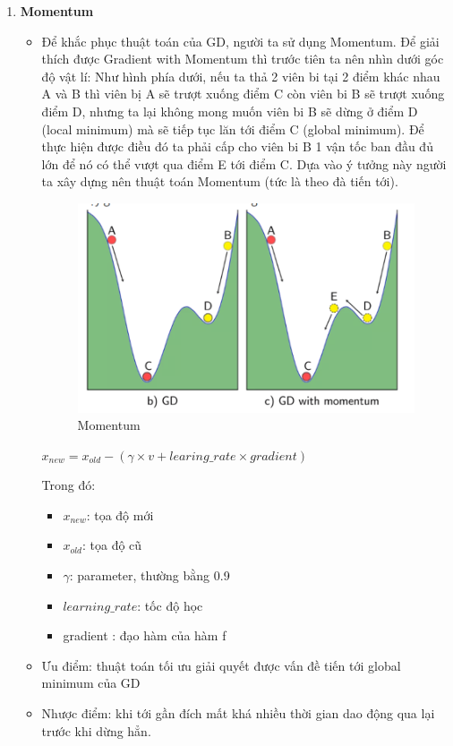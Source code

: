 \begin{enumerate}
    \item \textbf{Momentum}
    \begin{itemize}
        \item Để khắc phục thuật toán của GD, người ta sử dụng Momentum.  Để giải thích được Gradient with Momentum thì trước tiên ta nên nhìn dưới góc độ vật lí: Như hình phía dưới, nếu ta thả 2 viên bi tại 2 điểm khác nhau A và B thì viên bị A sẽ trượt xuống điểm C còn viên bi B sẽ trượt xuống điểm D, nhưng ta lại không mong muốn viên bi B sẽ dừng ở điểm D (local minimum) mà sẽ tiếp tục lăn tới điểm C (global minimum). Để thực hiện được điều đó ta phải cấp cho viên bi B 1 vận tốc ban đầu đủ lớn để nó có thể vượt qua điểm E tới điểm C. Dựa vào ý tưởng này người ta xây dựng nên thuật toán Momentum (tức là theo đà tiến tới).
        \begin{figure}[H]
            \centering
            \includegraphics[width=0.75\linewidth]{Momentum.png}
            \caption{Momentum}
            
        \end{figure}
        \begin{center}
                \large $x_{new} = x_{old} -(\gamma \times v + learing\_rate \times gradient)$
            \end{center}
        Trong đó:
        \begin{itemize}
        \item $x_{new}$: tọa độ mới
        \item $x_{old}$: tọa độ cũ
        \item $\gamma$: parameter, thường bằng 0.9
        \item $learning\_rate$: tốc độ học
        \item gradient : đạo hàm của hàm f
        \end{itemize}
        \item Ưu điểm: thuật toán tối ưu giải quyết được vấn đề tiến tới global minimum của GD
        \item Nhược điểm: khi tới gần đích mất khá nhiều thời gian dao động qua lại trước khi dừng hẳn.
    \end{itemize}
    

\end{enumerate}
